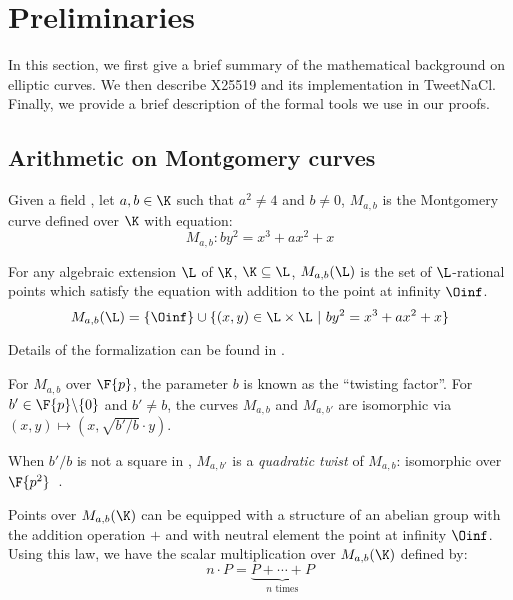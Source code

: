 \section{Preliminaries}
\label{sec:preliminaries}

In this section, we first give a brief summary of the mathematical background
on elliptic curves. We then describe X25519 and its implementation in TweetNaCl.
Finally, we provide a brief description of the formal tools we use in our proofs.





\subsection{Arithmetic on Montgomery curves}
\label{subsec:arithmetic-montgomery}

\begin{dfn}
  Given a field \K, let $a,b \in \K$ such that $a^2 \neq 4$ and $b \neq 0$,
  $M_{a,b}$ is the Montgomery curve defined over $\K$ with equation:
  $$M_{a,b}: by^2 = x^3 + ax^2 + x$$
\end{dfn}

\begin{dfn}
  For any algebraic extension $\L$ of $\K$, $\K \subseteq	\L$,
  $M_{a,b}(\L)$ is the set of $\L$-rational points which satisfy the equation with
  addition to the point at infinity $\Oinf$.
  $$M_{a,b}(\L) = \{\Oinf\} \cup \{(x,y) \in \L \times \L~|~by^2 = x^3 + ax^2 + x\}$$
\end{dfn}
Details of the formalization can be found in .


For $M_{a,b}$ over $\F{p}$, the parameter $b$ is known as the ``twisting factor''.
For $b'\in \F{p}\backslash\{0\}$ and $b' \neq b$, the curves $M_{a,b}$ and $M_{a,b'}$
are isomorphic via $(x,y) \mapsto (x, \sqrt{b'/b} \cdot y)$.

\begin{dfn}
  When $b'/b$ is not a square in , $M_{a,b'}$ is a \emph{quadratic twist} of $M_{a,b}$:
  isomorphic over $\F{p^2}$~\cite{cryptoeprint:2017:212}.
\end{dfn}

Points over $M_{a,b}(\K)$ can be equipped with a structure of an abelian group
with the addition operation $+$ and with neutral element the point at infinity $\Oinf$.
Using this law, we have the scalar multiplication over $M_{a,b}(\K)$ defined by:
  $$n\cdot P = \underbrace{P + \cdots + P}_{n\text{ times}}$$

